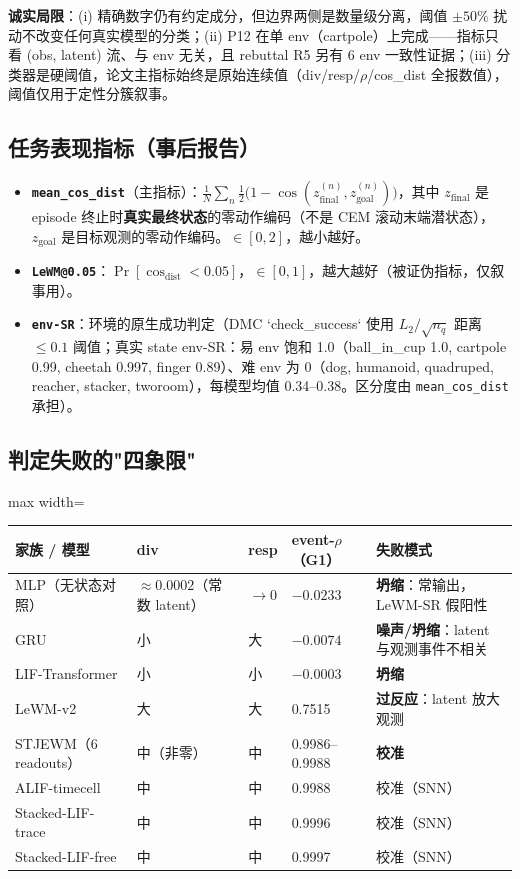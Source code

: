 \documentclass[11pt,a4paper]{article}
\begin{document}
\textbf{诚实局限}：(i) 精确数字仍有约定成分，但边界两侧是数量级分离，阈值 $\pm 50\%$ 扰动不改变任何真实模型的分类；(ii) P12 在单 env（cartpole）上完成——指标只看 (obs, latent) 流、与 env 无关，且 rebuttal R5 另有 6 env 一致性证据；(iii) 分类器是硬阈值，论文主指标始终是原始连续值（div/resp/$\rho$/cos\_dist 全报数值），阈值仅用于定性分簇叙事。

\subsection{任务表现指标（事后报告）}

\begin{itemize}[leftmargin=2em]
    \item \textbf{\texttt{mean\_cos\_dist}}（主指标）：$\tfrac{1}{N}\sum_n \tfrac{1}{2}\big(1 - \cos(z_{\text{final}}^{(n)}, z_{\text{goal}}^{(n)})\big)$，其中 $z_{\text{final}}$ 是 episode 终止时\textbf{真实最终状态}的零动作编码（不是 CEM 滚动末端潜状态），$z_{\text{goal}}$ 是目标观测的零动作编码。$\in [0, 2]$，越小越好。
    \item \textbf{\texttt{LeWM@0.05}}：$\Pr[\cos_\text{dist} < 0.05]$，$\in [0, 1]$，越大越好（被证伪指标，仅叙事用）。
    \item \textbf{\texttt{env-SR}}：环境的原生成功判定（DMC `check\_success` 使用 $L_2 / \sqrt{n_q}$ 距离 $\leq 0.1$ 阈值；真实 state env-SR：易 env 饱和 1.0（ball\_in\_cup 1.0, cartpole 0.99, cheetah 0.997, finger 0.89）、难 env 为 0（dog, humanoid, quadruped, reacher, stacker, tworoom），每模型均值 0.34–0.38。区分度由 \texttt{mean\_cos\_dist} 承担）。
\end{itemize}

\subsection{判定失败的"四象限"}

\begin{adjustbox}{max width=\textwidth}
\begin{tabular}{p{}p{}p{}p{}p{}}
\toprule
\textbf{家族 / 模型} & \textbf{div} & \textbf{resp} & \textbf{event-\ensuremath{\rho}（G1）} & \textbf{失败模式} \\
\midrule
MLP（无状态对照） & $\approx 0.0002$（常数 latent） & $\to 0$ & $-0.0233$ & \textbf{坍缩}：常输出，LeWM-SR 假阳性 \\
GRU & 小 & 大 & $-0.0074$ & \textbf{噪声/坍缩}：latent 与观测事件不相关 \\
LIF-Transformer & 小 & 小 & $-0.0003$ & \textbf{坍缩} \\
LeWM-v2 & 大 & 大 & 0.7515 & \textbf{过反应}：latent 放大观测 \\
STJEWM（6 readouts） & 中（非零） & 中 & 0.9986--0.9988 & \textbf{校准} \\
ALIF-timecell & 中 & 中 & 0.9988 & 校准（SNN） \\
Stacked-LIF-trace & 中 & 中 & 0.9996 & 校准（SNN） \\
Stacked-LIF-free & 中 & 中 & 0.9997 & 校准（SNN） \\
\bottomrule
\end{tabular}
\end{adjustbox}
\end{document}
